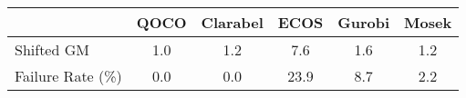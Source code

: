 \begin{tabular}{lccccc}
  \hline
   & \textbf{QOCO} & \textbf{Clarabel} & \textbf{ECOS} & \textbf{Gurobi} & \textbf{Mosek} \\ \hline
  Shifted GM & 1.0 & 1.2 & 7.6 & 1.6 & 1.2 \\ 
  Failure Rate (\%) & 0.0 & 0.0 & 23.9 & 8.7 & 2.2 \\ \hline 
\end{tabular}

